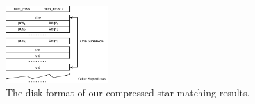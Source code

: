 
\begin{figure}[ht]
  \centering
  \includegraphics[width=0.35\textwidth]{img/compress.pdf}
  \caption{The disk format of our compressed star matching results.}\label{img:compress}
\end{figure}
